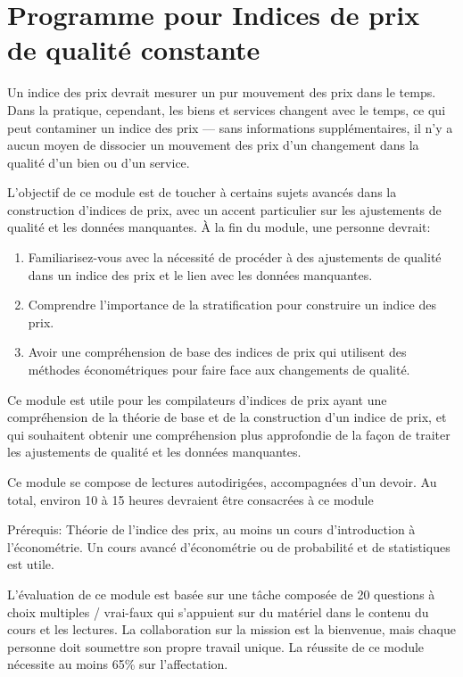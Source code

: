 \documentclass[
]{article}
\begin{document}
\hypertarget{programme-pour-indices-de-prix-de-qualituxe9-constante}{%
\section{Programme pour Indices de prix de qualité constante}\label{programme-pour-indices-de-prix-de-qualituxe9-constante}}

Un indice des prix devrait mesurer un pur mouvement des prix dans le temps. Dans la pratique, cependant, les biens et services changent avec le temps, ce qui peut contaminer un indice des prix --- sans informations supplémentaires, il n'y a aucun moyen de dissocier un mouvement des prix d'un changement dans la qualité d'un bien ou d'un service.

L'objectif de ce module est de toucher à certains sujets avancés dans la construction d'indices de prix, avec un accent particulier sur les ajustements de qualité et les données manquantes. À la fin du module, une personne devrait:

\begin{enumerate}
\def\labelenumi{\arabic{enumi}.}
\item
  Familiarisez-vous avec la nécessité de procéder à des ajustements de qualité dans un indice des prix et le lien avec les données manquantes.
\item
  Comprendre l'importance de la stratification pour construire un indice des prix.
\item
  Avoir une compréhension de base des indices de prix qui utilisent des méthodes économétriques pour faire face aux changements de qualité.
\end{enumerate}

Ce module est utile pour les compilateurs d'indices de prix ayant une compréhension de la théorie de base et de la construction d'un indice de prix, et qui souhaitent obtenir une compréhension plus approfondie de la façon de traiter les ajustements de qualité et les données manquantes.

Ce module se compose de lectures autodirigées, accompagnées d'un devoir. Au total, environ 10 à 15 heures devraient être consacrées à ce module

Prérequis: Théorie de l'indice des prix, au moins un cours d'introduction à l'économétrie. Un cours avancé d'économétrie ou de probabilité et de statistiques est utile.

L'évaluation de ce module est basée sur une tâche composée de 20 questions à choix multiples / vrai-faux qui s'appuient sur du matériel dans le contenu du cours et les lectures. La collaboration sur la mission est la bienvenue, mais chaque personne doit soumettre son propre travail unique. La réussite de ce module nécessite au moins 65\% sur l'affectation.
\end{document}
